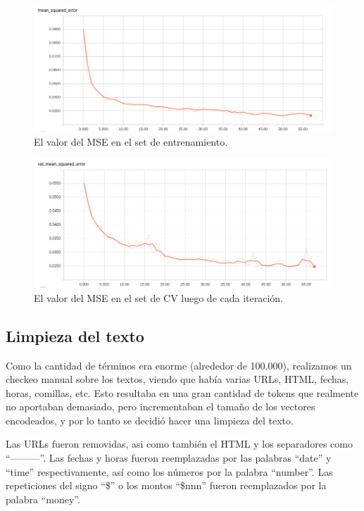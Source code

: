 \begin{figure}[h]
    \centering
    \includegraphics[width=1\linewidth]{Figures/train_mse.png}
    \decoRule
    \caption[MSE]{El valor del MSE en el set de entrenamiento.}
    \label{fig:MSE en el set de entrenamiento}
\end{figure}

\begin{figure}[h]
    \centering
    \includegraphics[width=1\linewidth]{Figures/val_mse.png}
    \decoRule
    \caption[Validation MSE]{El valor del MSE en el set de CV luego de cada iteraci\'on.}
    \label{fig:MSE en el set CV}
\end{figure}

\subsection{Limpieza del texto}

Como la cantidad de t\'erminos era enorme (alrededor de 100.000), realizamos un checkeo manual sobre
los textos, viendo que hab\'ia varias URLs, HTML, fechas, horas, comillas, etc. Esto resultaba en
una gran cantidad de tokens que realmente no aportaban demasiado, pero incrementaban el tama\~no de
los vectores encodeados, y por lo tanto  se decidi\'o hacer una limpieza del texto.

Las URLs fueron removidas, asi como tambi\'en el HTML y los separadores como ``---------''.
Las fechas y horas fueron reemplazadas por las palabras ``date'' y ``time'' respectivamente, as\'i
como los n\'umeros por la palabra ``number''. Las repeticiones del signo ``\$'' o los montos
``\$nnn'' fueron reemplazados por la palabra ``money''.

